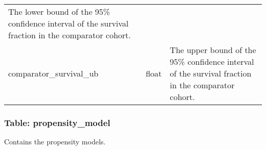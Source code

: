 \documentclass[
]{article}
\begin{document}
\begin{longtable}[]{@{}lll@{}}
\begin{minipage}[t]{0.50\columnwidth}
The lower bound of the 95\% confidence interval of the survival fraction
in the comparator cohort.\strut
\end{minipage}\tabularnewline
\begin{minipage}[t]{0.23\columnwidth}\raggedright
comparator\_survival\_ub\strut
\end{minipage} & \begin{minipage}[t]{0.18\columnwidth}\raggedright
float\strut
\end{minipage} & \begin{minipage}[t]{0.50\columnwidth}\raggedright
The upper bound of the 95\% confidence interval of the survival fraction
in the comparator cohort.\strut
\end{minipage}\tabularnewline
\bottomrule
\end{longtable}

\hypertarget{table-propensity_model}{%
\subsubsection{Table: propensity\_model}\label{table-propensity_model}}

Contains the propensity models.
\end{document}
